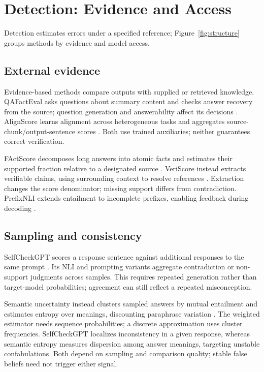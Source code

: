 \section{Detection: Evidence and Access}\label{sec:detection}
Detection estimates errors under a specified reference; Figure~\ref{fig:structure} groups methods by evidence and model access.

\subsection{External evidence}
Evidence-based methods compare outputs with supplied or retrieved knowledge. QAFactEval asks questions about summary content and checks answer recovery from the source; question generation and answerability affect its decisions \citep{fabbri-etal-2022-qafacteval}. AlignScore learns alignment across heterogeneous tasks and aggregates source-chunk/output-sentence scores \citep{zha-etal-2023-alignscore}. Both use trained auxiliaries; neither guarantees correct verification.

FActScore decomposes long answers into atomic facts and estimates their supported fraction relative to a designated source \citep{min-etal-2023-factscore}. VeriScore instead extracts verifiable claims, using surrounding context to resolve references \citep{song-etal-2024-veriscore}. Extraction changes the score denominator; missing support differs from contradiction. PrefixNLI extends entailment to incomplete prefixes, enabling feedback during decoding \citep{harary-etal-2026-prefixnli}.

\subsection{Sampling and consistency}
SelfCheckGPT scores a response sentence against additional responses to the same prompt \citep{manakul-etal-2023-selfcheckgpt}. Its NLI and prompting variants aggregate contradiction or non-support judgments across samples. This requires repeated generation rather than target-model probabilities; agreement can still reflect a repeated misconception.

Semantic uncertainty instead clusters sampled answers by mutual entailment and estimates entropy over meanings, discounting paraphrase variation \citep{extsemanticuncertainty2023,extsemanticentropy2024}. The weighted estimator needs sequence probabilities; a discrete approximation uses cluster frequencies. SelfCheckGPT localizes inconsistency in a given response, whereas semantic entropy measures dispersion among answer meanings, targeting unstable confabulations. Both depend on sampling and comparison quality; stable false beliefs need not trigger either signal.

